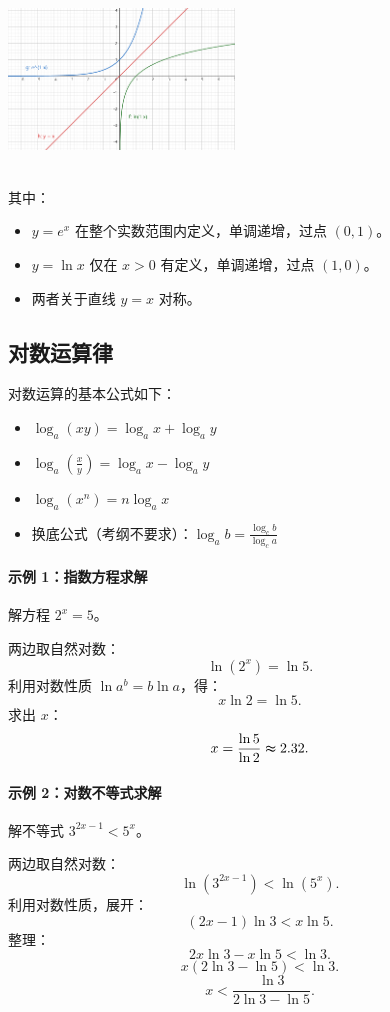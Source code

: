 \documentclass[8pt,a4paper,twoside]{tau-class/tau}
\begin{document}
\begin{center}
    \includegraphics[width=0.45\textwidth]{figures/log and exponent.PNG}
\end{center}
\\
其中：
\begin{itemize}
    \item $y = e^x$ 在整个实数范围内定义，单调递增，过点 $(0,1)$。
    \item $y = \ln x$ 仅在 $x > 0$ 有定义，单调递增，过点 $(1,0)$。
    \item 两者关于直线 $y = x$ 对称。
\end{itemize}

\subsection{对数运算律}
对数运算的基本公式如下：
\begin{itemize}
    \item $\log_a (xy) = \log_a x + \log_a y$
    \item $\log_a \left(\frac{x}{y}\right) = \log_a x − \log_a y$
    \item $\log_a (x^n) = n \log_a x$
    \item 换底公式（考纲不要求）：$\log_a b = \frac{\log_c b}{\log_c a}$
\end{itemize}

\paragraph{示例 1：指数方程求解}
解方程 $2^x = 5$。

两边取自然对数：
\[
    \ln (2^x) = \ln 5.
\]
利用对数性质 $\ln a^b = b \ln a$，得：
\[
    x \ln 2 = \ln 5.
\]
求出 $x$：
\[
    x = \frac{\ln 5}{\ln 2} \thickapprox 2.32.
\]

\paragraph{示例 2：对数不等式求解}
解不等式 $3^{2x−1} < 5^x$。

两边取自然对数：
\[
    \ln (3^{2x−1}) < \ln (5^x).
\]
利用对数性质，展开：
\[
    (2x−1) \ln 3 < x \ln 5.
\]
整理：
\[
    2x \ln 3 − x \ln 5 < \ln 3.
\]
\[
    x(2 \ln 3 − \ln 5) < \ln 3.
\]
\[
    x < \frac{\ln 3}{2 \ln 3 − \ln 5}.
\]
\end{document}
